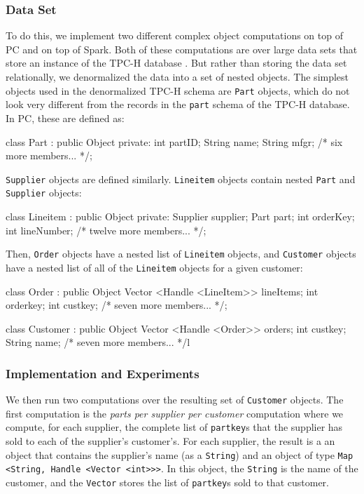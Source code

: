 \subsubsection{Data Set}

To do this, we implement two different complex object computations on top of PC and on top of Spark.
Both of these computations are over large data sets that store an instance of the TPC-H database \cite{council2008tpc}.
But rather than storing the data set relationally, we denormalized the data into a set of nested objects. 
The simplest objects used in the denormalized TPC-H schema are 
\texttt{Part} objects, which do not look very different from the records in the  \texttt{part} schema of the TPC-H database.
In PC, these are defined as:

\begin{codesmall}
class Part : public Object {
private:
   int partID;
   String name;
   String mfgr;
   /* six more members... */};
\end{codesmall}

\noindent
\texttt{Supplier} objects are defined similarly.
\texttt{Lineitem} objects contain nested \texttt{Part} and \texttt{Supplier} objects:

\begin{codesmall}
class Lineitem : public Object {
private:
   Supplier supplier;
   Part part;
   int orderKey;
   int lineNumber;
   /* twelve more members... */}; 
\end{codesmall}
 
\noindent Then,
\texttt{Order} objects have a nested list of \texttt{Lineitem} objects, and \texttt{Customer} objects have a nested
list of all of the
\texttt{Lineitem} objects for a given customer:

\begin{codesmall}
class Order : public Object {
   Vector <Handle <LineItem>> lineItems;
   int orderkey;
   int custkey;
   /* seven more members... */};

class Customer : public Object {
   Vector <Handle <Order>> orders;
   int custkey;
   String name;
   /* seven more members... */}l
\end{codesmall}

\subsubsection{Implementation and Experiments}
We then run two computations over the resulting set of \texttt{Customer} objects.  
The first computation is the \emph{parts per supplier per customer} computation where we
compute, for each supplier,
the complete list of \texttt{partkey}s that the supplier has sold to each of the supplier's customer's.
For each supplier, the result is a an object that contains the supplier's name (as a \texttt{String}) and
an object of type \texttt{Map <String, Handle <Vector <int>>>}.  In this
object, the \texttt{String} is the name of the customer, and the \texttt{Vector} stores the list of
\texttt{partkey}s sold to that customer.

